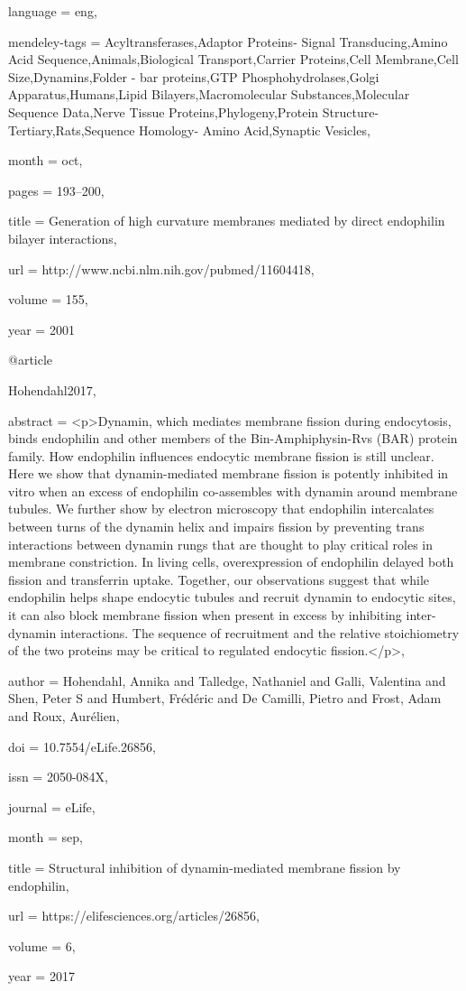 {language = {eng},

mendeley-tags = {Acyltransferases,Adaptor Proteins- Signal Transducing,Amino Acid Sequence,Animals,Biological Transport,Carrier Proteins,Cell Membrane,Cell Size,Dynamins,Folder - bar proteins,GTP Phosphohydrolases,Golgi Apparatus,Humans,Lipid Bilayers,Macromolecular Substances,Molecular Sequence Data,Nerve Tissue Proteins,Phylogeny,Protein Structure- Tertiary,Rats,Sequence Homology- Amino Acid,Synaptic Vesicles},

month = {oct},

pages = {193--200},

title = {{Generation of high curvature membranes mediated by direct endophilin bilayer interactions}},

url = {http://www.ncbi.nlm.nih.gov/pubmed/11604418},

volume = {155},

year = {2001}

}

@article{Hohendahl2017,

abstract = {{\textless}p{\textgreater}Dynamin, which mediates membrane fission during endocytosis, binds endophilin and other members of the Bin-Amphiphysin-Rvs (BAR) protein family. How endophilin influences endocytic membrane fission is still unclear. Here we show that dynamin-mediated membrane fission is potently inhibited in vitro when an excess of endophilin co-assembles with dynamin around membrane tubules. We further show by electron microscopy that endophilin intercalates between turns of the dynamin helix and impairs fission by preventing trans interactions between dynamin rungs that are thought to play critical roles in membrane constriction. In living cells, overexpression of endophilin delayed both fission and transferrin uptake. Together, our observations suggest that while endophilin helps shape endocytic tubules and recruit dynamin to endocytic sites, it can also block membrane fission when present in excess by inhibiting inter-dynamin interactions. The sequence of recruitment and the relative stoichiometry of the two proteins may be critical to regulated endocytic fission.{\textless}/p{\textgreater}},

author = {Hohendahl, Annika and Talledge, Nathaniel and Galli, Valentina and Shen, Peter S and Humbert, Fr{\'{e}}d{\'{e}}ric and {De Camilli}, Pietro and Frost, Adam and Roux, Aur{\'{e}}lien},

doi = {10.7554/eLife.26856},

issn = {2050-084X},

journal = {eLife},

month = {sep},

title = {{Structural inhibition of dynamin-mediated membrane fission by endophilin}},

url = {https://elifesciences.org/articles/26856},

volume = {6},

year = {2017}

}

